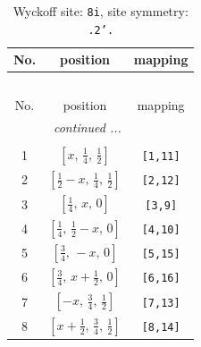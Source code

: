 \documentclass[fleqn,8pt]{jsarticle}
\begin{document}
\begin{longtable}{ccc}
\caption{Wyckoff site: {\tt 8i}, site symmetry: {\tt .2'.}}
 \\
 \hline \hline
No. & position & mapping \\ \hline \endfirsthead

\multicolumn{2}{l}{\tablename\ \thetable{}} \\
 \hline \hline
No. & position & mapping \\ \hline \endhead

 \hline \hline
\multicolumn{2}{r}{\footnotesize\it continued ...} \\ \endfoot

 \hline \hline
\multicolumn{2}{r}{} \\ \endlastfoot

1 & $\left[ x,\, \frac{1}{4},\, \frac{1}{2} \right]$ & {\tt [1,11]} \\ \hline
2 & $\left[ \frac{1}{2} - x,\, \frac{1}{4},\, \frac{1}{2} \right]$ & {\tt [2,12]} \\ \hline
3 & $\left[ \frac{1}{4},\, x,\, 0 \right]$ & {\tt [3,9]} \\ \hline
4 & $\left[ \frac{1}{4},\, \frac{1}{2} - x,\, 0 \right]$ & {\tt [4,10]} \\ \hline
5 & $\left[ \frac{3}{4},\, - x,\, 0 \right]$ & {\tt [5,15]} \\ \hline
6 & $\left[ \frac{3}{4},\, x + \frac{1}{2},\, 0 \right]$ & {\tt [6,16]} \\ \hline
7 & $\left[ - x,\, \frac{3}{4},\, \frac{1}{2} \right]$ & {\tt [7,13]} \\ \hline
8 & $\left[ x + \frac{1}{2},\, \frac{3}{4},\, \frac{1}{2} \right]$ & {\tt [8,14]} \\
\end{longtable}
\renewcommand{\arraystretch}{1.2}
\end{document}
